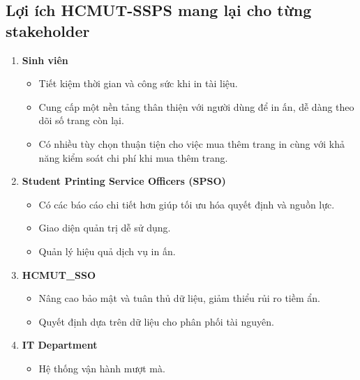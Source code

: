 \documentclass[a4paper]{article}
\begin{document}
    \subsection{Lợi ích HCMUT-SSPS mang lại cho từng stakeholder}
    \begin{enumerate}
        \item {\textbf{Sinh viên}}
            \begin{itemize}
                \item Tiết kiệm thời gian và công sức khi in tài liệu.
                \item Cung cấp một nền tảng thân thiện với người dùng để in ấn, dễ dàng theo dõi số trang còn lại.
                \item Có nhiều tùy chọn thuận tiện cho việc mua thêm trang in cùng với khả năng kiểm soát chi phí khi mua thêm trang.
            \end{itemize}
        \item {\textbf{Student Printing Service Officers (SPSO)}}
            \begin{itemize}
                \item Có các báo cáo chi tiết hơn giúp tối ưu hóa quyết định và nguồn lực.
                \item Giao diện quản trị dễ sử dụng.
                \item Quản lý hiệu quả dịch vụ in ấn.
            \end{itemize}
            \item {\textbf{HCMUT\_SSO}}
            \begin{itemize}
                \item Nâng cao bảo mật và tuân thủ dữ liệu, giảm thiểu rủi ro tiềm ẩn.
                \item Quyết định dựa trên dữ liệu cho phân phối tài nguyên.
            \end{itemize}
        \item {\textbf{IT Department}}
            \begin{itemize}
                \item Hệ thống vận hành mượt mà.

\end{itemize}
\end{enumerate}
\end{document}
